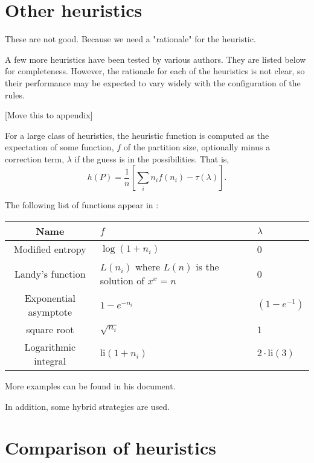 \section{Other heuristics}




These are not good. Because we need a "rationale" for the heuristic. 

A few more heuristics have been tested by various authors. They are listed below for completeness. However, the rationale for each of the heuristics is not clear, so their performance may be expected to vary widely with the configuration of the rules.

[Move this to appendix]

For a large class of heuristics, the heuristic function is computed as the expectation of some function, $f$ of the partition size, optionally minus a correction term, $\lambda$ if the guess is in the possibilities. That is,
\[
h(P) = \frac{1}{n} \left[\sum_i n_i f(n_i) - \tau(\lambda) \right].
\]

The following list of functions appear in \cite{pepperdine10}:
\begin{center}
\begin{tabular}{c l l}
\hline
Name & $f$ & $\lambda$ \\
\hline
Modified entropy & $\log (1+n_i)$ & 0 \\
Landy's function & $L(n_i)$ where $L(n)$ is the solution of $x^x = n$ & 0 \\
Exponential asymptote & $1-e^{-n_i}$ & $(1-e^{-1})$ \\
square root & $\sqrt{n_i}$ & 1 \\
Logarithmic integral & $\text{li}(1+n_i)$ & $2 \cdot \text{li}(3)$ \\
\hline
\end{tabular}
\end{center}
More examples can be found in his document.

In addition, some hybrid strategies are used.

\section{Comparison of heuristics}

